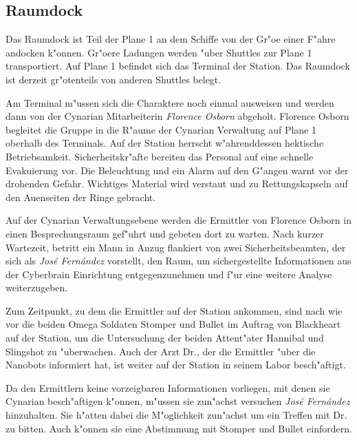 \subsection{Raumdock}
Das Raumdock ist Teil der Plane 1 an dem Schiffe von der Gr"o\3e einer F"ahre andocken k"onnen. Gr"o\3ere Ladungen werden "uber Shuttles zur Plane 1 transportiert. Auf Plane 1 befindet sich das Terminal der Station. Das Raumdock ist derzeit gr"o\3tenteils von anderen Shuttles belegt.

Am Terminal m"ussen sich die Charaktere noch einmal ausweisen und werden dann von der Cynarian Mitarbeiterin \emph{Florence Osborn} abgeholt. Florence Osborn begleitet die Gruppe in die R"aume der Cynarian Verwaltung auf Plane 1 oberhalb des Terminals. Auf der Station herrscht w"ahrenddessen hektische Betriebsamkeit. Sicherheitskr"afte bereiten das Personal auf eine schnelle Evakuierung vor. Die Beleuchtung und ein Alarm auf den G"angen warnt vor der drohenden Gefahr. Wichtiges Material wird verstaut und zu Rettungskapseln auf den Au\3enseiten der Ringe gebracht.

Auf der Cynarian Verwaltungsebene werden die Ermittler von Florence Osborn in einen Besprechungsraum gef"uhrt und gebeten dort zu warten. Nach kurzer Wartezeit, betritt ein Mann in Anzug flankiert von zwei Sicherheitsbeamten, der sich als \emph{Jos\'e Fern\'andez} vorstellt, den Raum, um sichergestellte Informationen aus der Cyberbrain Einrichtung entgegenzunehmen und f"ur eine weitere Analyse weiterzugeben. 

Zum Zeitpunkt, zu dem die Ermittler auf der Station ankommen, sind nach wie vor die beiden Omega Soldaten Stomper und Bullet im Auftrag von Blackheart auf der Station, um die Untersuchung der beiden Attent"ater Hannibal und Slingshot zu "uberwachen. Auch der Arzt 
Dr.{}, der die Ermittler "uber die Nanobots informiert hat, ist weiter auf der Station in seinem Labor besch"aftigt.

Da den Ermittlern keine vorzeigbaren Informationen vorliegen, mit denen sie Cynarian besch"aftigen k"onnen, m"ussen sie zun"achst versuchen \emph{Jos\'e Fern\'andez} hinzuhalten. Sie h"atten dabei die M"oglichkeit zun"achst um ein Treffen mit Dr.{} zu bitten. Auch k"onnen sie eine Abstimmung mit Stomper und Bullet einfordern.

